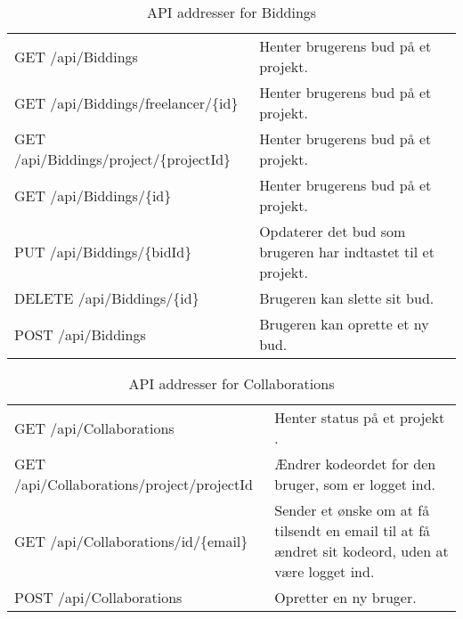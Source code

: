 \begin{table}[H]
	\centering
	\caption{API addresser for Biddings}
	\label{tab:web_user}
	\begin{tabular}{|L{0.3\textwidth}|L{0.70\textwidth}|}
		\hline
		\\
		\hline
		GET \newline
		/api/Biddings &
		Henter brugerens bud på et projekt. \\
        \hline
        GET \newline
		/api/Biddings/freelancer/\{id\} &
		Henter brugerens bud på et projekt. \\
        \hline
        GET \newline
		/api/Biddings/project/\{projectId\} &
		Henter brugerens bud på et projekt. \\
        \hline
        GET \newline
		/api/Biddings/\{id\} &
		Henter brugerens bud på et projekt. \\
		\hline
		PUT \newline
		/api/Biddings/\{bidId\} &
		Opdaterer det bud som brugeren har indtastet til et projekt. \\
		\hline
		DELETE \newline
		/api/Biddings/\{id\} &
		Brugeren kan slette sit bud. \\
		\hline
		POST \newline
		/api/Biddings &
		Brugeren kan oprette et ny bud. \\
		\hline
	
	\end{tabular}
\end{table}

\begin{table}[H]
	\centering
	\caption{API addresser for Collaborations}
	\label{tab:web_user}
	\begin{tabular}{|L{0.3\textwidth}|L{0.70\textwidth}|}
		\hline
		\\
		\hline
		GET \newline
		/api/Collaborations &
		Henter status på et projekt . \\
		\hline
        GET \newline
		/api/Collaborations/project/{projectId} &
		Ændrer kodeordet for den bruger, som er logget ind. \\
		\hline
		GET \newline
		/api/Collaborations/{id}/\{email\} &
		Sender et ønske om at få tilsendt en email til at få ændret sit kodeord, uden at være logget ind. 
		\\
		\hline
		POST \newline
		/api/Collaborations &
		Opretter en ny bruger. \\
		\hline
	
	\end{tabular}
\end{table}

